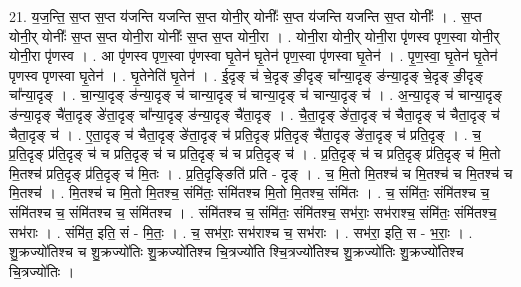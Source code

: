\documentclass[17pt]{extarticle}
\begin{document}
21. य॒ज॒न्ति॒ स॒प्त स॒प्त य॑जन्ति यजन्ति स॒प्त योनी॒र् योनीः᳚ स॒प्त य॑जन्ति यजन्ति स॒प्त योनीः᳚ । . स॒प्त योनी॒र् योनीः᳚ स॒प्त स॒प्त योनी॒रा योनीः᳚ स॒प्त स॒प्त योनी॒रा । . योनी॒रा योनी॒र् योनी॒रा पृ॑णस्व पृण॒स्वा योनी॒र् योनी॒रा पृ॑णस्व । . आ पृ॑णस्व पृण॒स्वा पृ॑णस्वा घृ॒तेन॑ घृ॒तेन॑ पृण॒स्वा पृ॑णस्वा घृ॒तेन॑ । . पृ॒ण॒स्वा॒ घृ॒तेन॑ घृ॒तेन॑ पृणस्व पृणस्वा घृ॒तेन॑ । . घृ॒तेनेति॑ घृ॒तेन॑ । . ई॒दृङ् च॑ चे॒दृङ् ङी॒दृङ् चा᳚न्या॒दृङ् ङ॑न्या॒दृङ् चे॒दृङ् ङी॒दृङ् चा᳚न्या॒दृङ् । . चा॒न्या॒दृङ् ङ॑न्या॒दृङ् च॑ चान्या॒दृङ् च॑ चान्या॒दृङ् च॑ चान्या॒दृङ् च॑ । . अ॒न्या॒दृङ् च॑ चान्या॒दृङ् ङ॑न्या॒दृङ् चै॑ता॒दृङ् ङे॑ता॒दृङ् चा᳚न्या॒दृङ् ङ॑न्या॒दृङ् चै॑ता॒दृङ् । . चै॒ता॒दृङ् ङे॑ता॒दृङ् च॑ चैता॒दृङ् च॑ चैता॒दृङ् च॑ चैता॒दृङ् च॑ । . ए॒ता॒दृङ् च॑ चैता॒दृङ् ङे॑ता॒दृङ् च॑ प्रति॒दृङ् प्र॑ति॒दृङ् चै॑ता॒दृङ् ङे॑ता॒दृङ् च॑ प्रति॒दृङ् । . च॒ प्र॒ति॒दृङ् प्र॑ति॒दृङ् च॑ च प्रति॒दृङ् च॑ च प्रति॒दृङ् च॑ च प्रति॒दृङ् च॑ । . प्र॒ति॒दृङ् च॑ च प्रति॒दृङ् प्र॑ति॒दृङ् च॑ मि॒तो मि॒तश्च॑ प्रति॒दृङ् प्र॑ति॒दृङ् च॑ मि॒तः । . प्र॒ति॒दृङ्ङिति॑ प्रति - दृङ् । . च॒ मि॒तो मि॒तश्च॑ च मि॒तश्च॑ च मि॒तश्च॑ च मि॒तश्च॑ । . मि॒तश्च॑ च मि॒तो मि॒तश्च॒ संमि॑तः॒ संमि॑तश्च मि॒तो मि॒तश्च॒ संमि॑तः । . च॒ संमि॑तः॒ संमि॑तश्च च॒ संमि॑तश्च च॒ संमि॑तश्च च॒ संमि॑तश्च । . संमि॑तश्च च॒ संमि॑तः॒ संमि॑तश्च॒ सभ॑राः॒ सभ॑राश्च॒ संमि॑तः॒ संमि॑तश्च॒ सभ॑राः । . संमि॑त॒ इति॒ सं - मि॒तः॒ । . च॒ सभ॑राः॒ सभ॑राश्च च॒ सभ॑राः । . सभ॑रा॒ इति॒ स - भ॒राः॒ । . शु॒क्रज्यो॑तिश्च च शु॒क्रज्यो॑तिः शु॒क्रज्यो॑तिश्च चि॒त्रज्यो॑ति श्चि॒त्रज्यो॑तिश्च शु॒क्रज्यो॑तिः शु॒क्रज्यो॑तिश्च चि॒त्रज्यो॑तिः । \newline
\end{document}
